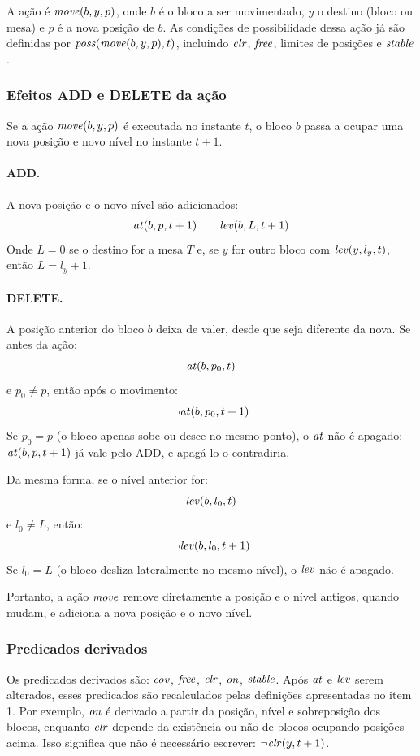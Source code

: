 A ação é $\mathit{move}(b,y,p)$, onde $b$ é o bloco a ser movimentado, $y$ o destino (bloco ou mesa) e $p$ é a nova posição de $b$.
As condições de possibilidade dessa ação já são definidas por $\mathit{poss}(\mathit{move}(b,y,p),t)$, incluindo $\mathit{clr}$, $\mathit{free}$, limites de posições e $\mathit{stable}$.

\subsubsection{Efeitos ADD e DELETE da ação}
Se a ação $\mathit{move}(b,y,p)$ é executada no instante $t$, o bloco $b$ passa a ocupar uma nova posição e novo nível no instante $t+1$.

\paragraph{ADD.} A nova posição e o novo nível são adicionados:
\[
\mathit{at}(b,p,t+1)\qquad \mathit{lev}(b,L,t+1)
\]
Onde $L=0$ se o destino for a mesa $T$ e, se $y$ for outro bloco com $\mathit{lev}(y,l_y,t)$, então $L=l_y+1$.

\paragraph{DELETE.} A posição anterior do bloco $b$ deixa de valer, desde que seja diferente da nova. Se antes da ação:
\[
\mathit{at}(b,p_0,t)
\]
e $p_0\neq p$, então após o movimento:
\[
\neg\mathit{at}(b,p_0,t+1)
\]
Se $p_0=p$ (o bloco apenas sobe ou desce no mesmo ponto), o $\mathit{at}$ não é apagado: $\mathit{at}(b,p,t+1)$ já vale pelo ADD, e apagá-lo o contradiria.

Da mesma forma, se o nível anterior for:
\[
\mathit{lev}(b,l_0,t)
\]
e $l_0\neq L$, então:
\[
\neg\mathit{lev}(b,l_0,t+1)
\]
Se $l_0=L$ (o bloco desliza lateralmente no mesmo nível), o $\mathit{lev}$ não é apagado.

Portanto, a ação $\mathit{move}$ remove diretamente a posição e o nível antigos, quando mudam, e adiciona a nova posição e o novo nível.

\subsubsection{Predicados derivados}
Os predicados derivados são: $\mathit{cov}$, $\mathit{free}$, $\mathit{clr}$, $\mathit{on}$, $\mathit{stable}$.
Após $\mathit{at}$ e $\mathit{lev}$ serem alterados, esses predicados são recalculados pelas definições apresentadas no item 1.
Por exemplo, $\mathit{on}$ é derivado a partir da posição, nível e sobreposição dos blocos, enquanto $\mathit{clr}$ depende da existência ou não de blocos ocupando posições acima.
Isso significa que não é necessário escrever: $\neg\mathit{clr}(y,t+1)$.

